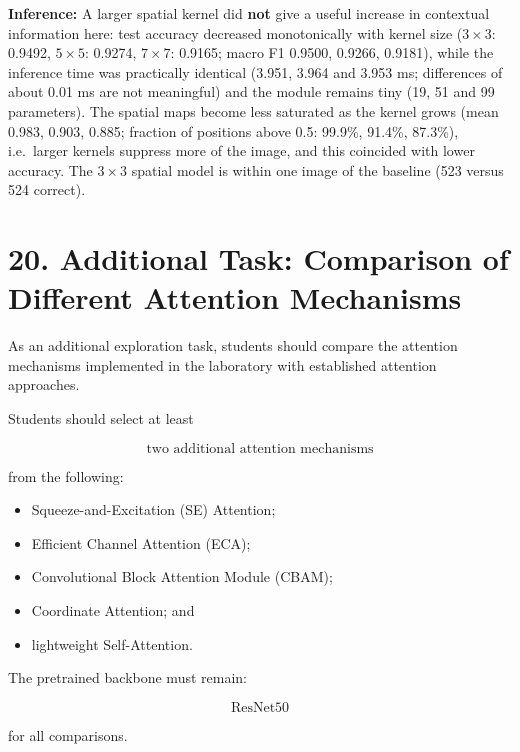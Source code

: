 \documentclass[10pt]{article}
\begin{document}
\textbf{Inference:} A larger spatial kernel did \textbf{not} give a useful increase in contextual information here: test accuracy decreased monotonically with kernel size
($3\times3$: 0.9492, $5\times5$: 0.9274, $7\times7$: 0.9165; macro F1 0.9500, 0.9266, 0.9181), while the inference time was practically identical
(3.951, 3.964 and 3.953 ms; differences of about 0.01 ms are not meaningful) and the module remains tiny (19, 51 and 99 parameters). The spatial maps become less saturated as the kernel grows
(mean 0.983, 0.903, 0.885; fraction of positions above 0.5: 99.9\%, 91.4\%, 87.3\%), i.e.\ larger kernels suppress more of the image, and this coincided with lower accuracy. The $3\times3$ spatial model is within one image of the baseline (523 versus 524 correct).

\section*{20. Additional Task: Comparison of Different Attention Mechanisms}

As an additional exploration task, students should compare the attention
mechanisms implemented in the laboratory with established attention
approaches.

Students should select at least

\[
\boxed{\text{two additional attention mechanisms}}
\]

from the following:

\begin{itemize}

\item Squeeze-and-Excitation (SE) Attention;

\item Efficient Channel Attention (ECA);

\item Convolutional Block Attention Module (CBAM);

\item Coordinate Attention; and

\item lightweight Self-Attention.

\end{itemize}

The pretrained backbone must remain:

\[
\boxed{\text{ResNet50}}
\]

for all comparisons.
\end{document}
